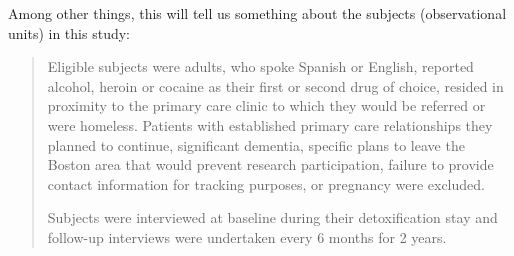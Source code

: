 \documentclass[twoside]{book}\usepackage[]{graphicx}\usepackage[]{xcolor}
\begin{document}
Among other things, this will tell us something about the subjects (observational units) in
this study:
\begin{quote}
	Eligible subjects were adults, who spoke Spanish or English, reported
	alcohol, heroin or cocaine as their first or second drug of choice, resided
	in proximity to the primary care clinic to which they would be referred or
	were homeless. Patients with established primary care relationships they
	planned to continue, significant dementia, specific plans to leave the
	Boston area that would prevent research participation, failure to provide
	contact information for tracking purposes, or pregnancy were excluded.

Subjects were interviewed at baseline during their detoxification stay and
follow-up interviews were undertaken every 6 months for 2 years.
\end{quote}
\end{document}

